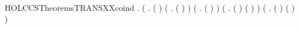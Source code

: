 \newcommand{\HOLCCSTheoremsTRANSXXcases}{\UseVerbatim{HOLCCSTheoremsTRANSXXcases}}
\begin{SaveVerbatim}{HOLCCSTheoremsTRANSXXcoind}
\HOLTokenTurnstile{} \HOLSymConst{\HOLTokenForall{}}.
       (\HOLSymConst{\HOLTokenForall{}}  .
                \HOLSymConst{\HOLTokenImp{}}
            ( \HOLSymConst{=} ) \HOLSymConst{\HOLTokenDisj{}}
            (\HOLSymConst{\HOLTokenExists{}} . ( \HOLSymConst{=}  \HOLSymConst{\ensuremath{+}} ) \HOLSymConst{\HOLTokenConj{}}    ) \HOLSymConst{\HOLTokenDisj{}}
            (\HOLSymConst{\HOLTokenExists{}} . ( \HOLSymConst{=}  \HOLSymConst{\ensuremath{+}} ) \HOLSymConst{\HOLTokenConj{}}    ) \HOLSymConst{\HOLTokenDisj{}}
            (\HOLSymConst{\HOLTokenExists{}}  .
                 ( \HOLSymConst{=}  \HOLSymConst{\ensuremath{\parallel}} ) \HOLSymConst{\HOLTokenConj{}} ( \HOLSymConst{=}  \HOLSymConst{\ensuremath{\parallel}} ) \HOLSymConst{\HOLTokenConj{}}    ) \HOLSymConst{\HOLTokenDisj{}}
            (\HOLSymConst{\HOLTokenExists{}}  .
                 ( \HOLSymConst{=}  \HOLSymConst{\ensuremath{\parallel}} ) \HOLSymConst{\HOLTokenConj{}} ( \HOLSymConst{=}  \HOLSymConst{\ensuremath{\parallel}} ) \HOLSymConst{\HOLTokenConj{}}    ) \HOLSymConst{\HOLTokenDisj{}}

\end{SaveVerbatim}
